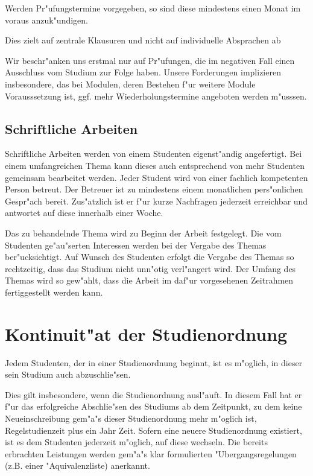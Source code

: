 Werden Pr"ufungstermine vorgegeben, so sind diese mindestens einen Monat im voraus
anzuk"undigen.
\begin{kcmt}\begin{komacmt}
	Dies zielt auf zentrale Klausuren und nicht 
	auf individuelle Absprachen ab

	Wir beschr"anken uns erstmal nur auf Pr"ufungen, die im negativen Fall 
	einen Ausschluss vom Studium zur Folge haben.  Unsere Forderungen implizieren 
	insbesondere, das bei Modulen, deren Bestehen f"ur weitere Module Vorausssetzung 
	ist, ggf. mehr Wiederholungstermine angeboten werden m"usssen. 
\end{komacmt}\end{kcmt}

\subsection{Schriftliche Arbeiten}

Schriftliche Arbeiten werden von einem Studenten eigenst"andig angefertigt.
Bei einem umfangreichen Thema kann dieses auch entsprechend von mehr Studenten gemeinsam bearbeitet werden.
Jeder Student wird von einer fachlich kompetenten Person betreut.
Der Betreuer ist zu mindestens einem monatlichen pers"onlichen Gespr"ach bereit.
Zus"atzlich ist er f"ur kurze Nachfragen jederzeit erreichbar und antwortet auf diese innerhalb einer Woche.

Das zu behandelnde Thema wird zu Beginn der Arbeit festgelegt.
Die vom Studenten ge"au"serten Interessen werden bei der Vergabe des Themas ber"ucksichtigt.
Auf Wunsch des Studenten erfolgt die Vergabe des Themas so rechtzeitig, dass das Studium nicht unn"otig verl"angert wird.
Der Umfang des Themas wird so gew"ahlt, dass die Arbeit im daf"ur vorgesehenen Zeitrahmen fertiggestellt werden kann.


\section{Kontinuit"at der Studienordnung}

Jedem Studenten, der in einer Studienordnung beginnt, ist es m"oglich, in dieser sein Studium auch abzuschlie"sen.

Dies gilt insbesondere, wenn die Studienordnung ausl"auft.
In diesem Fall hat er f"ur das erfolgreiche Abschlie"sen des Studiums ab dem Zeitpunkt, zu dem keine Neueinschreibung gem"a"s dieser Studienordnung mehr m"oglich ist, Regelstudienzeit plus ein Jahr Zeit.
Sofern eine neuere Studienordnung existiert, ist es dem Studenten jederzeit m"oglich, auf diese wechseln.
Die bereits erbrachten Leistungen werden gem"a"s klar formulierten "Ubergangsregelungen (z.B. einer "Aquivalenzliste) anerkannt.


